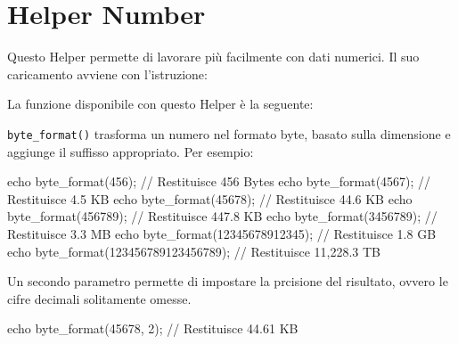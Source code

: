 \section{Helper Number}
\label{helper:number}

Questo Helper permette di lavorare più facilmente con dati numerici. Il suo caricamento avviene con l'istruzione:


La funzione disponibile con questo Helper è la seguente:

\verb|byte_format()| trasforma un numero nel formato byte, basato sulla dimensione e aggiunge il suffisso appropriato. Per esempio:

\begin{code}
echo byte_format(456); // Restituisce 456 Bytes
echo byte_format(4567); // Restituisce 4.5 KB
echo byte_format(45678); // Restituisce 44.6 KB
echo byte_format(456789); // Restituisce 447.8 KB
echo byte_format(3456789); // Restituisce 3.3 MB
echo byte_format(12345678912345); // Restituisce 1.8 GB
echo byte_format(123456789123456789); // Restituisce 11,228.3 TB
\end{code}

Un secondo parametro permette di impostare la prcisione del risultato, ovvero le cifre decimali solitamente omesse.

\begin{code}
echo byte_format(45678, 2); // Restituisce 44.61 KB
\end{code}